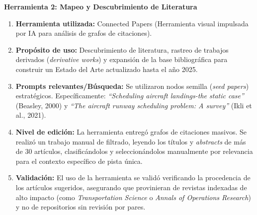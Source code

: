 \documentclass[letter, 10pt]{article}
\begin{document}
\vspace{0.3cm}
\noindent \textbf{Herramienta 2: Mapeo y Descubrimiento de Literatura}
\begin{enumerate}
    \item \textbf{Herramienta utilizada:} Connected Papers (Herramienta visual impulsada por IA para an\'alisis de grafos de citaciones).
    \item \textbf{Prop\'osito de uso:} Descubrimiento de literatura, rastreo de trabajos derivados (\textit{derivative works}) y expansi\'on de la base bibliogr\'afica para construir un Estado del Arte actualizado hasta el a\~no 2025.
    \item \textbf{Prompts relevantes/B\'usqueda:} Se utilizaron nodos semilla (\textit{seed papers}) estrat\'egicos. Espec\'ificamente: \textit{``Scheduling aircraft landings-the static case''} (Beasley, 2000) y \textit{``The aircraft runway scheduling problem: A survey''} (Ikli et al., 2021)\cite{ikli2021}.
    \item \textbf{Nivel de edici\'on:} La herramienta entreg\'o grafos de citaciones masivos. Se realiz\'o un trabajo manual de filtrado, leyendo los t\'itulos y \textit{abstracts} de m\'as de 30 art\'iculos, clasific\'andolos y seleccion\'andolos manualmente por relevancia para el contexto espec\'ifico de pista \'unica.
    \item \textbf{Validaci\'on:} El uso de la herramienta se valid\'o verificando la procedencia de los art\'iculos sugeridos, asegurando que provinieran de revistas indexadas de alto impacto (como \textit{Transportation Science} o \textit{Annals of Operations Research}) y no de repositorios sin revisi\'on por pares.
\end{enumerate}



\end{document}
